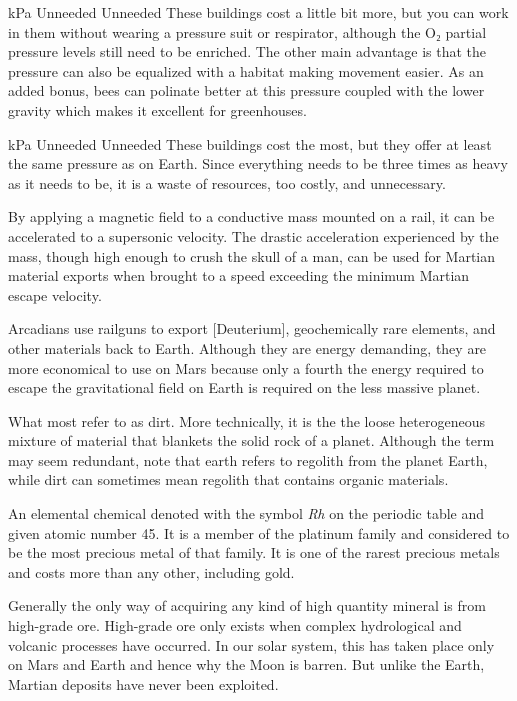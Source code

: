 {{    \bTR
       kPa \eTC
      \bTC Unneeded \eTC
      \bTC Unneeded \eTC
      \bTC These buildings cost a little bit more, but you can work in them without wearing a pressure suit or respirator, although the O₂ partial pressure levels still need to be enriched. The other main advantage is that the pressure can also be equalized with a habitat making movement easier. As an added bonus, bees can polinate better at this pressure coupled with the lower gravity which makes it excellent for greenhouses. \eTC
    \eTR

    \bTR
       kPa \eTC
      \bTC Unneeded \eTC
      \bTC Unneeded \eTC
      \bTC These buildings cost the most, but they offer at least the same pressure as on Earth. Since everything needs to be three times as heavy as it needs to be, it is a waste of resources, too costly, and unnecessary. \eTC
    \eTR
    \eTABLEbody

\eTABLE
}

By applying a magnetic field to a conductive mass mounted on a rail, it can be accelerated to a supersonic velocity. The drastic acceleration experienced by the mass, though high enough to crush the skull of a man, can be used for Martian material exports when brought to a speed exceeding the minimum Martian escape velocity.

Arcadians use railguns to export [Deuterium], geochemically rare elements, and other materials back to Earth. Although they are energy demanding, they are more economical to use on Mars because only a fourth the energy required to escape the gravitational field on Earth is required on the less massive planet.

What most refer to as dirt. More technically, it is the the loose heterogeneous mixture of material that blankets the solid rock of a planet. Although the term may seem redundant, note that earth refers to regolith from the planet Earth, while dirt can sometimes mean regolith that contains organic materials.

An elemental chemical denoted with the symbol {\it Rh} on the periodic table and given atomic number 45. It is a member of the platinum family and considered to be the most precious metal of that family. It is one of the rarest precious metals and costs more than any other, including gold.

Generally the only way of acquiring any kind of high quantity mineral is from high-grade ore. High-grade ore only exists when complex hydrological and volcanic processes have occurred. In our solar system, this has taken place only on Mars and Earth and hence why the Moon is barren. But unlike the Earth, Martian deposits have never been exploited.

}
